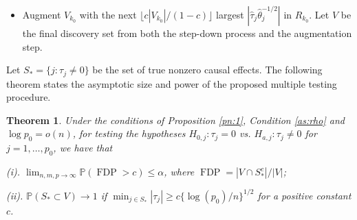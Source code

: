 \documentclass[12pt]{article}
\def\AZ{{ \mathrm{\scriptscriptstyle AZ} }}
\newtheorem{theorem}{Theorem}
\theoremstyle{definition}
\newcommand{\bz}{{\mathbf z}}
\begin{document}
\begin{itemize}
\item Augment $V_{k_0}$ with 
the next $\lfloor c |V_{k_0}| / (1 - c) \rfloor$ largest $|\hat{\tau}_{j} \hat{\theta}_{j}^{-1/2}|$ in $R_{k_0}$. 
Let $V$ be the final discovery set from both the step-down process and the augmentation step.

\end{itemize}

%
Let $S_{\ast} = \{j: \tau_{j} \neq 0\}$ be the set of true nonzero causal effects.
The following theorem states the asymptotic size and power of the proposed multiple testing procedure.

\begin{theorem}\label{thm:1}
Under the conditions of Proposition \ref{pn:1}, Condition \ref{as:rho} and $\log p_0 = o(n)$, for testing the hypotheses $H_{0, j}: \tau_{j} = 0$ vs. $H_{a, j}: \tau_{j} \neq 0$ for $j = 1, \ldots, p_0$,
we have that

(i). 
$\lim_{n, m, p \to \infty} \mathbb{P}(\operatorname{FDP} > c) \leq \alpha$, where $\operatorname{FDP} = {|V \cap S_{\ast}^{c}|} / {|V|}$;

(ii). $\mathbb{P}( S_{\ast} \subset V )\rightarrow1$ if $\min_{j \in S_{\ast}}|\tau_{j}| \geq c \{\log(p_0) / n\}^{1/2}$ for a positive constant $c$.
\end{theorem}
\end{document}
